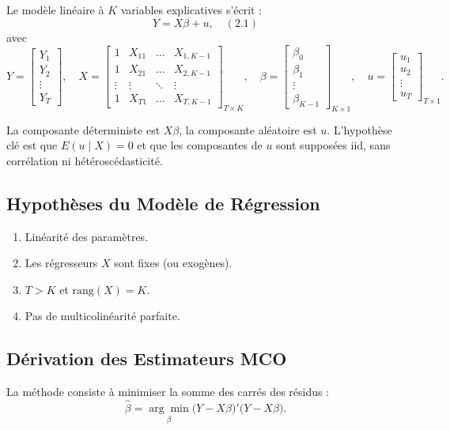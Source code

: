 \documentclass[14pt]{extarticle} %
\begin{document}
Le modèle linéaire à \(K\) variables explicatives s’écrit :
\[
Y = X \beta + u, \quad (2.1)
\]
avec 
\[
Y = 
\begin{bmatrix}
Y_1 \\
Y_2 \\
\vdots \\
Y_T
\end{bmatrix}, 
\quad
X = 
\begin{bmatrix}
1 & X_{11} & \dots & X_{1,K-1} \\
1 & X_{21} & \dots & X_{2,K-1} \\
\vdots & \vdots & \ddots & \vdots \\
1 & X_{T1} & \dots & X_{T,K-1}
\end{bmatrix}_{T\times K},
\quad
\beta = 
\begin{bmatrix}
\beta_0 \\
\beta_1 \\
\vdots \\
\beta_{K-1}
\end{bmatrix}_{K\times 1},
\quad
u = 
\begin{bmatrix}
u_1 \\
u_2 \\
\vdots \\
u_T
\end{bmatrix}_{T\times 1}.
\]

La composante déterministe est \(X\beta\), la composante aléatoire est \(u\). L’hypothèse clé est que \(E(u \mid X) = 0\) et que les composantes de \(u\) sont supposées iid, sans corrélation ni hétéroscédasticité.

\subsection{Hypothèses du Modèle de Régression}
\begin{enumerate}
    \item Linéarité des paramètres.
    \item Les régresseurs \(X\) sont fixes (ou exogènes).
    \item \(T > K\) et \(\mathrm{rang}(X) = K\).
    \item Pas de multicolinéarité parfaite.
\end{enumerate}

\subsection{Dérivation des Estimateurs MCO}

La méthode consiste à minimiser la somme des carrés des résidus :
\[
\hat{\beta} 
= \underset{\beta}{\arg\min} 
\bigl(Y - X \beta \bigr)' \bigl(Y - X \beta \bigr).
\]
\end{document}
